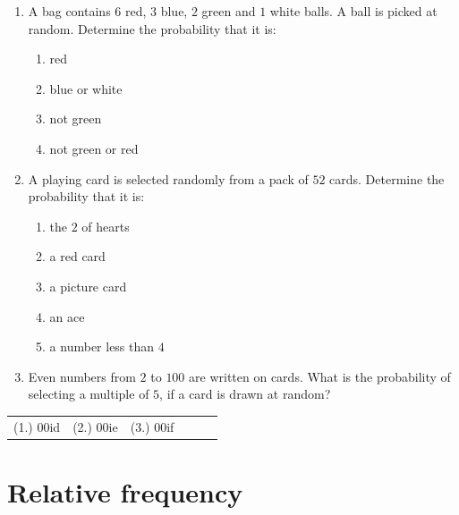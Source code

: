 \begin{exercises}{}
{
  \begin{enumerate}[itemsep=5pt, label=\textbf{\arabic*}. ]
  \item 
A bag contains $6$ red, $3$ blue, $2$ green and $1$ white
    balls. A ball is picked at random. Determine the probability that it
    is:
    \begin{enumerate}[noitemsep, label=\textbf{(\alph*)} ]
    \item red
    \item blue or white
    \item not green
    \item not green or red
    \end{enumerate}
  \item 
A playing card is selected randomly from a pack of $52$
    cards. Determine the probability that it is:
    \begin{enumerate}[noitemsep, label=\textbf{(\alph*)} ]
    \item the $2$ of hearts
    \item a red card
    \item a picture card
    \item an ace
    \item a number less than $4$
    \end{enumerate}
\item Even numbers from $2$ to $100$ are written on cards. 
  What is
    the probability of selecting a multiple of $5$, if a card is drawn
    at random?

\end{enumerate}
\practiceinfo

\begin{tabular}{cccccc}
    (1.) 00id& (2.) 00ie& (3.) 00if\\
  \end{tabular}
}
\end{exercises}

\section{Relative frequency}


